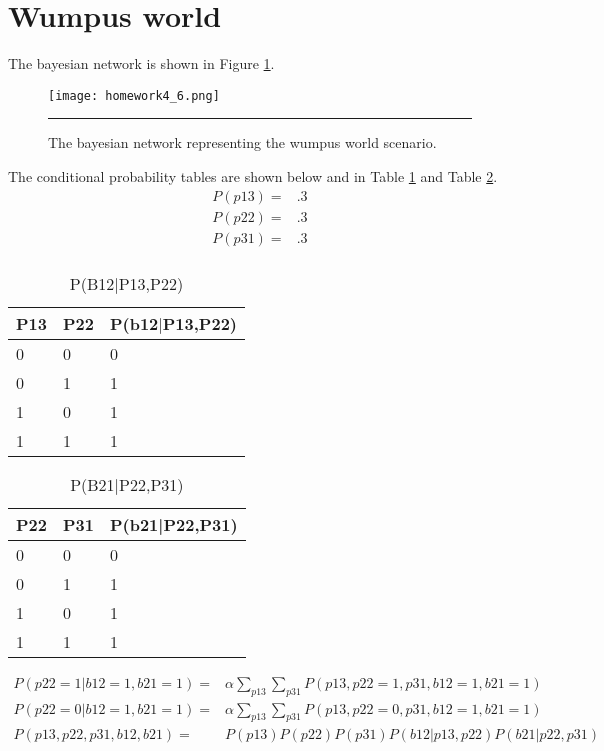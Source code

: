 \documentclass[12pt]{article}
\begin{document}
\section{Wumpus world}
The bayesian network is shown in Figure \ref{fig:wumpus}.
\begin{figure}
  \centering
      {\texttt{[image: homework4\_6.png]}} \rule{1\linewidth}{1pt}
      \caption{The bayesian network representing the wumpus world scenario.}
      \label{fig:wumpus}
\end{figure}
The conditional probability tables are shown below and in Table \ref{tab:pb12} and Table \ref{tab:pb21}.
\begin{align*}
  P(p13) =& .3 \\
  P(p22) =& .3 \\
  P(p31) =& .3 \\
\end{align*}
\begin{table}
  \centering
  \begin{tabularx}{\textwidth}{|X|X|X|} \hline
    P13 & P22 & P(b12$|$P13,P22) \\ \hline
    0 & 0 & 0 \\ \hline
    0 & 1 & 1 \\ \hline
    1 & 0 & 1 \\ \hline
    1 & 1 & 1 \\ \hline
  \end{tabularx}
  \caption{P(B12$|$P13,P22)}
  \label{tab:pb12}
\end{table}
\begin{table}
  \centering
  \begin{tabularx}{\textwidth}{|X|X|X|} \hline
    P22 & P31 & P(b21|P22,P31) \\ \hline
    0 & 0 & 0 \\ \hline
    0 & 1 & 1 \\ \hline
    1 & 0 & 1 \\ \hline
    1 & 1 & 1 \\ \hline
  \end{tabularx}
  \caption{P(B21$|$P22,P31)}
  \label{tab:pb21}
\end{table}
\begin{align*}
  P(p22=1|b12=1,b21=1)
  =& \alpha \sum_{p13} \sum_{p31} P(p13,p22=1,p31,b12=1,b21=1)\\
  P(p22=0|b12=1,b21=1)
  =& \alpha \sum_{p13} \sum_{p31} P(p13,p22=0,p31,b12=1,b21=1)\\
  P(p13,p22,p31,b12,b21)
  =& P(p13)P(p22)P(p31)P(b12|p13,p22)P(b21|p22,p31)\\
\end{align*}
\end{document}
